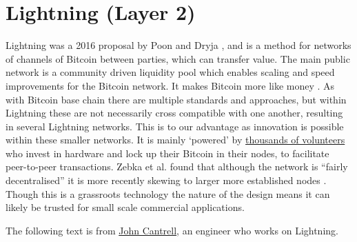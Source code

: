 \section{Lightning (Layer 2)}
Lightning was a 2016 proposal by Poon and Dryja \cite{poon2016bitcoin}, and is a method for networks of channels of Bitcoin between parties, which can transfer value. The main public network is a community driven liquidity pool which enables scaling and speed improvements for the Bitcoin network. It makes Bitcoin more like money \cite{divakaruni2022lightning}. As with Bitcoin base chain there are multiple standards and approaches, but within Lightning these are not necessarily cross compatible with one another, resulting in several Lightning networks. This is to our advantage as innovation is possible within these smaller networks. It is mainly `powered' by \href{https://plebnet.wiki/wiki/Main_Page}{thousands of volunteers} who invest in hardware and lock up their Bitcoin in their nodes, to facilitate peer-to-peer transactions. Zebka et al. found that although the network is ``fairly decentralised'' it is more recently skewing to larger more established nodes \cite{zabka2022short}. Though this is a grassroots technology the nature of the design means it can likely be trusted for small scale commercial applications.\par
The following text is from \href{https://medium.com/@johncantrell97?p=5cc72f2c664}{John Cantrell}, an engineer who works on Lightning.\par

